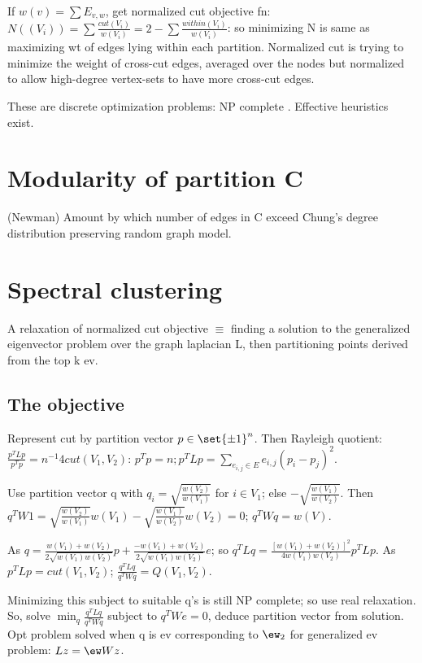 \documentclass[oneside, article]{memoir}
\begin{document}
If $w(v) = \sum E_{v,w}$, get normalized cut objective fn: $N((V_{i})) = \sum \frac{cut(V_{i})}{w(V_{i})} = 2 - \sum \frac{within(V_{i})}{w(V_{i})}$: so minimizing N is same as maximizing wt of edges lying within each partition. Normalized cut is trying to minimize the weight of cross-cut edges, averaged over the nodes but normalized to allow high-degree vertex-sets to have more cross-cut edges.

These are discrete optimization problems: NP complete \why. Effective heuristics exist.

\section{Modularity of partition C}
(Newman) Amount by which number of edges in C exceed Chung's degree distribution preserving random graph model.

\section{Spectral clustering}
\core A relaxation of normalized cut objective $\equiv$ finding a solution to the generalized eigenvector problem over the graph laplacian L, then partitioning points derived from the top k ev.

\subsection{The objective}
Represent cut by partition vector $p \in \set{\pm 1}^{n}$. Then Rayleigh quotient: $\frac{p^{T}Lp}{p^{T}p}= n^{-1}4 cut(V_{1}, V_{2})$: $p^{T}p=n; p^{T}Lp = \sum_{e_{i,j} \in E} e_{i,j}(p_{i}-p_{j})^{2}$.

Use partition vector q with $q_{i} = \sqrt{\frac{w(V_{2})}{w(V_{1})}}$ for $i \in V_{1}$; else $-\sqrt{\frac{w(V_{1})}{w(V_{2})}}$. Then $q^{T}W1 = \sqrt{\frac{w(V_{2})}{w(V_{1})}} w(V_{1}) - \sqrt{\frac{w(V_{1})}{w(V_{2})}} w(V_{2})= 0$; $q^{T}Wq = w(V)$.

As $q = \frac{w(V_{1})+w(V_{2})}{2\sqrt{w(V_{1})w(V_{2})}} p + \frac{-w(V_{1})+w(V_{2})}{2\sqrt{w(V_{1})w(V_{2})}}e$; so $q^{T}Lq = \frac{[w(V_{1})+w(V_{2})]^{2}}{4 w(V_{1})w(V_{2})}p^{T}Lp$. As $p^{T}Lp = cut(V_{1}, V_{2})$; $\frac{q^{T}Lq}{q^{T}Wq} = Q(V_{1}, V_{2})$.

Minimizing this subject to suitable q's is still NP complete; so use real relaxation. So, solve $\min_{q} \frac{q^{T}Lq}{q^{T}Wq}$ subject to $q^{T}We=0$, deduce partition vector from solution. Opt problem solved when q is ev corresponding to $\ew_{2}$ for generalized ev problem: $Lz = \ew Wz$. \why
\end{document}
